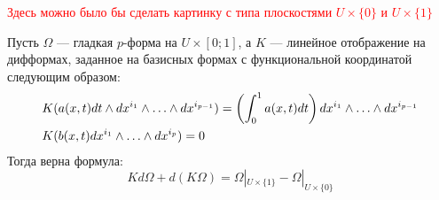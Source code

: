 \textcolor{red}{Здесь можно было бы сделать картинку с типа плоскостями $U \times \{0\}$ и $U \times \{1\}$}

\begin{lemma}
	Пусть $\Omega$ --- гладкая $p$-форма на $U \times [0; 1]$, а $K$ --- линейное отображение на дифформах, заданное на базисных формах с функциональной координатой следующим образом:
	\begin{align*}
		&{K(a(x, t)dt \wedge dx^{i_1} \wedge \ldots \wedge dx^{i_{p - 1}}) = \left(\int_0^1 a(x, t)dt\right)dx^{i_1} \wedge \ldots \wedge dx^{i_{p - 1}}}
		\\
		&{K(b(x, t)dx^{i_1} \wedge \ldots \wedge dx^{i_p}) = 0}
	\end{align*}
	Тогда верна формула:
	\[
		Kd\Omega + d(K\Omega) = \Omega|_{U \times \{1\}} - \Omega|_{U \times \{0\}}
	\]
\end{lemma}

